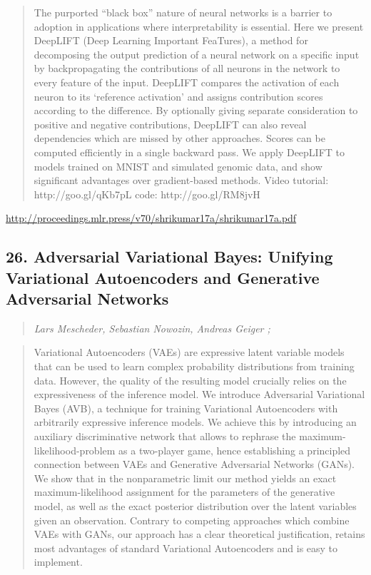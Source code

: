 \documentclass{article}
\begin{document}
\begin{quote}
    The purported “black box” nature of neural networks is a barrier to adoption in applications where interpretability is essential. Here we present DeepLIFT (Deep Learning Important FeaTures), a method for decomposing the output prediction of a neural network on a specific input by backpropagating the contributions of all neurons in the network to every feature of the input. DeepLIFT compares the activation of each neuron to its `reference activation’ and assigns contribution scores according to the difference. By optionally giving separate consideration to positive and negative contributions, DeepLIFT can also reveal dependencies which are missed by other approaches. Scores can be computed efficiently in a single backward pass. We apply DeepLIFT to models trained on MNIST and simulated genomic data, and show significant advantages over gradient-based methods. Video tutorial: http://goo.gl/qKb7pL code: http://goo.gl/RM8jvH  \end{quote}

\href{http://proceedings.mlr.press/v70/shrikumar17a/shrikumar17a.pdf}{http://proceedings.mlr.press/v70/shrikumar17a/shrikumar17a.pdf}

\subsection{26. Adversarial Variational Bayes: Unifying Variational Autoencoders and Generative Adversarial Networks}

\begin{quote}
\footnotesize{\textit{Lars Mescheder, Sebastian Nowozin, Andreas Geiger ;}}
\end{quote}

\begin{quote}
    Variational Autoencoders (VAEs) are expressive latent variable models that can be used to learn complex probability distributions from training data. However, the quality of the resulting model crucially relies on the expressiveness of the inference model. We introduce Adversarial Variational Bayes (AVB), a technique for training Variational Autoencoders with arbitrarily expressive inference models. We achieve this by introducing an auxiliary discriminative network that allows to rephrase the maximum-likelihood-problem as a two-player game, hence establishing a principled connection between VAEs and Generative Adversarial Networks (GANs). We show that in the nonparametric limit our method yields an exact maximum-likelihood assignment for the parameters of the generative model, as well as the exact posterior distribution over the latent variables given an observation. Contrary to competing approaches which combine VAEs with GANs, our approach has a clear theoretical justification, retains most advantages of standard Variational Autoencoders and is easy to implement.  \end{quote}
\end{document}
